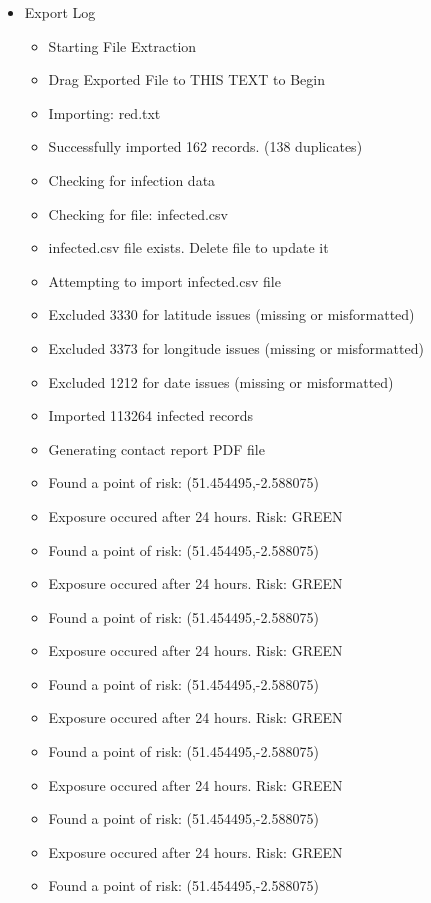 \documentclass{article}
\begin{document}
\begin{itemize}
   \item  Export Log
   \begin{itemize}
			\item	{Starting File Extraction}
			\item	{Drag Exported File to THIS TEXT to Begin}
			\item	{Importing: red.txt}
			\item	{Successfully imported 162 records. (138 duplicates)}
			\item	{Checking for infection data}
			\item	{Checking for file: infected.csv}
			\item	{infected.csv file exists. Delete file to update it}
			\item	{Attempting to import infected.csv file}
			\item	{Excluded 3330 for latitude issues (missing or misformatted)}
			\item	{Excluded 3373 for longitude issues (missing or misformatted)}
			\item	{Excluded 1212 for date issues (missing or misformatted)}
			\item	{Imported 113264 infected records}
			\item	{Generating contact report PDF file}
			\item	{Found a point of risk: (51.454495,-2.588075)}
			\item	{Exposure occured after 24 hours. Risk: GREEN}
			\item	{Found a point of risk: (51.454495,-2.588075)}
			\item	{Exposure occured after 24 hours. Risk: GREEN}
			\item	{Found a point of risk: (51.454495,-2.588075)}
			\item	{Exposure occured after 24 hours. Risk: GREEN}
			\item	{Found a point of risk: (51.454495,-2.588075)}
			\item	{Exposure occured after 24 hours. Risk: GREEN}
			\item	{Found a point of risk: (51.454495,-2.588075)}
			\item	{Exposure occured after 24 hours. Risk: GREEN}
			\item	{Found a point of risk: (51.454495,-2.588075)}
			\item	{Exposure occured after 24 hours. Risk: GREEN}
			\item	{Found a point of risk: (51.454495,-2.588075)}

\end{itemize}
\end{itemize}
\end{document}
